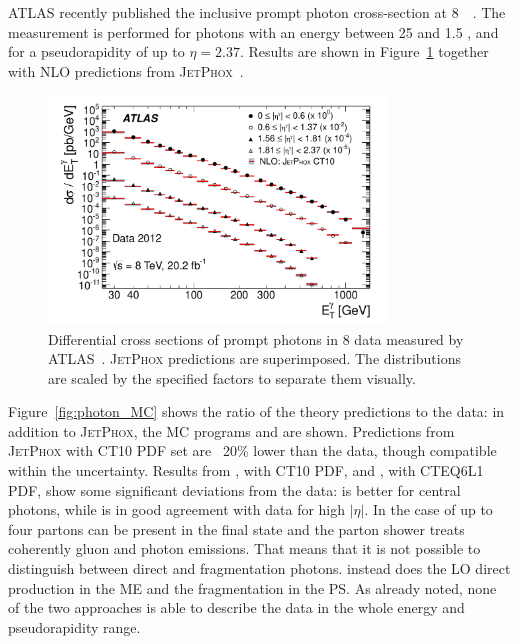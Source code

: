 \documentclass{PoS}
\providecommand{\JETPHOX} {{\textsc{JetPhox}}\xspace}
\begin{document}
ATLAS recently published the inclusive prompt photon cross-section at 8~\TeV~\cite{Aad:2016xcr}. The measurement is
performed for photons with an energy between 25 \GeV and 1.5 \TeV, and for a pseudorapidity of up to $\eta = 2.37$. 
Results are shown in Figure~\ref{fig:photon} together with NLO predictions from \JETPHOX~\cite{Catani:2002ny}. 
\begin{figure}
\begin{center}
\includegraphics[width=0.8\textwidth]{Figure11.pdf} 
\caption{Differential cross sections of prompt photons in 8 \TeV data measured by ATLAS~\cite{Aad:2016xcr}. \JETPHOX predictions are superimposed. The
  distributions are scaled by the specified factors to separate them visually. }  
\label{fig:photon}
\end{center}
\end{figure}
Figure~\ref{fig:photon_MC} shows the ratio of the theory predictions to the data: in addition to \JETPHOX, the MC programs
\PYTHIA and \SHERPA are shown. Predictions from \JETPHOX with CT10 PDF set are ~20\% lower than the data, though compatible within the
uncertainty. Results from \SHERPA, with CT10 PDF, and \PYTHIA, with
CTEQ6L1 PDF, show some significant deviations from the data: \SHERPA is better for central photons, while
\PYTHIA is in good agreement with data for high $|\eta|$. In the case of \SHERPA up to four partons can be present in the
final state and the parton shower treats coherently gluon and photon emissions. That means that it is not possible to
distinguish between direct and fragmentation photons. \PYTHIA instead does the LO direct production in the ME and the
fragmentation in the PS. As already noted, none of the two approaches is able to describe the data in the whole energy
and pseudorapidity range.
\end{document}

